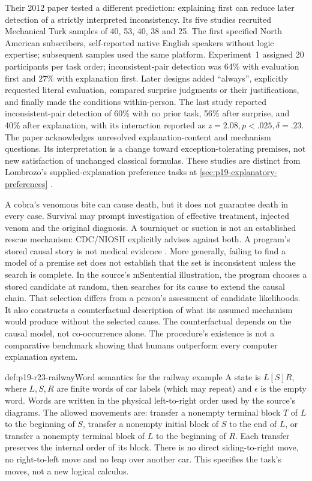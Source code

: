 Their 2012 paper tested a different prediction: explaining first can
reduce later detection of a strictly interpreted inconsistency. Its five
studies recruited Mechanical Turk samples of 40, 53, 40, 38 and 25.
The first specified North American subscribers, self-reported native
English speakers without logic expertise; subsequent samples used the
same platform. Experiment~1 assigned 20 participants per task order;
inconsistent-pair detection was 64\% with evaluation first and 27\%
with explanation first. Later designs added ``always'', explicitly
requested literal evaluation, compared surprise judgments or their
justifications, and finally made the conditions within-person. The last
study reported inconsistent-pair detection of 60\% with no prior task,
56\% after surprise, and 40\% after explanation, with its interaction
reported as \(z=2.08,p<.025,\delta=.23\). The paper acknowledges
unresolved explanation-content and mechanism questions. Its interpretation
is a change toward exception-tolerating premises, not new satisfaction
of unchanged classical formulas. These studies are distinct from
Lombrozo's supplied-explanation preference tasks at
\cref{sec:p19-explanatory-preferences}
\cite[pp.~486--490]{KhemlaniJohnsonLaird2012HiddenConflicts}.

A cobra's venomous bite can cause death, but it does not guarantee
death in every case.
Survival may prompt investigation of effective treatment, injected venom
and the original diagnosis. A tourniquet or suction is not an established
rescue mechanism: CDC/NIOSH explicitly advises against both. A program's
stored causal story is not medical evidence
\cite{NIOSH2019VenomousSnakes}. More generally, failing to find a model
of a premise set does not establish that the set is inconsistent unless
the search is complete. In the source's mSentential illustration, the
program chooses a stored candidate at random, then searches for its cause
to extend the causal chain. That selection differs from a person's
assessment of candidate likelihoods. It also constructs a counterfactual
description of what its assumed mechanism would produce without the
selected cause. The counterfactual depends on the causal model, not
co-occurrence alone. The procedure's existence is not a comparative benchmark
showing that humans outperform every computer explanation system.

\begin{hbdefinition}{def:p19-r23-railway}{Word semantics for the railway example}
A state is \(L[S]R\), where \(L,S,R\) are finite words of car
labels (which may repeat) and \(\epsilon\) is the empty word. Words are written in the
physical left-to-right order used by the source's diagrams. The allowed
movements are: transfer a nonempty terminal block \(T\) of \(L\) to
the beginning of \(S\), transfer a nonempty initial block of \(S\)
to the end of \(L\), or transfer a nonempty terminal block of \(L\)
to the beginning of \(R\). Each transfer preserves the internal order
of its block. There is no direct siding-to-right move, no right-to-left
move and no leap over another car. This specifies the task's moves,
not a new logical calculus.
\end{hbdefinition}

